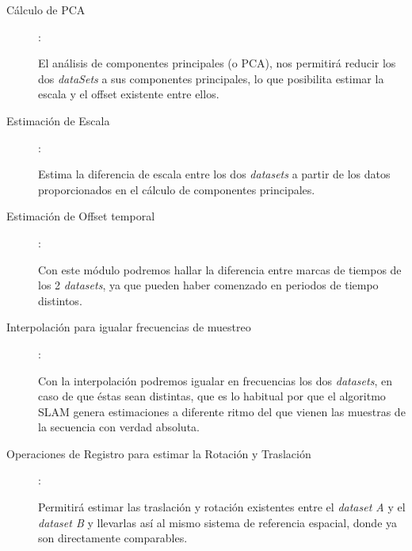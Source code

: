 \begin{description}
\item [Cálculo de PCA]:

El análisis de componentes principales (o PCA), nos permitirá reducir los dos  \textit{dataSets} a sus componentes principales, lo que posibilita estimar la escala y el offset existente entre ellos.
\item [Estimación de Escala]: 

Estima la diferencia de escala entre los dos \textit{datasets} a partir de los datos proporcionados en el cálculo de componentes principales.
\item [Estimación de Offset temporal]: 

Con este módulo podremos hallar la diferencia entre marcas de tiempos de los 2 \textit{datasets}, ya que pueden haber comenzado en periodos de tiempo distintos.
\item [Interpolación para igualar frecuencias de muestreo]: 

Con la interpolación podremos igualar en frecuencias los dos \textit{datasets}, en caso de que éstas sean distintas, que es lo habitual por que el algoritmo SLAM genera estimaciones a diferente ritmo del que vienen las muestras de la secuencia con verdad absoluta.

\item [Operaciones de Registro para estimar la Rotación y Traslación]: 

Permitirá estimar las traslación y rotación existentes entre el \textit{dataset A} y el \textit{dataset B} y llevarlas así al mismo sistema de referencia espacial, donde ya son directamente comparables.
\end{description}


